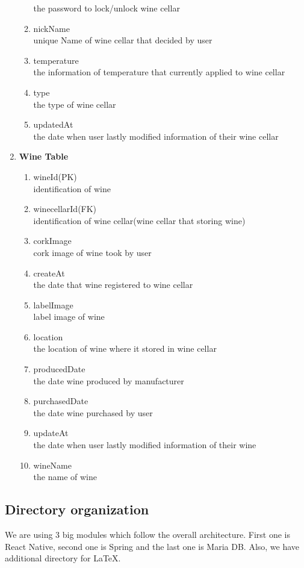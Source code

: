 \documentclass[conference]{IEEEtran}
\numberwithin{figure}{subsection}
\begin{document}
\begin{enumerate}
\begin{enumerate}
        the password to lock/unlock wine cellar
        \item nickName\\
        unique Name of wine cellar that decided by user
        \item temperature\\
        the information of temperature that currently applied to wine cellar
        \item type\\
        the type of wine cellar
        \item updatedAt\\
        the date when user lastly modified information of their wine cellar
    \end{enumerate}
    \item \textbf{Wine Table}
     \begin{enumerate}
        \item wineId(PK)\\
        identification of wine
        \item winecellarId(FK)\\
        identification of wine cellar(wine cellar that storing wine)
        \item corkImage\\
        cork image of wine took by user
        \item createAt\\
        the date that wine registered to wine cellar
        \item labelImage\\
        label image of wine
        \item location\\
        the location of wine where it stored in wine cellar
        \item producedDate\\
        the date wine produced by manufacturer
        \item purchasedDate\\
        the date wine purchased by user
        \item updateAt\\ the date when user lastly modified information of their wine
        \item wineName\\ the name of wine
    \end{enumerate}
\end{enumerate}

\subsection{Directory organization}
We are using 3 big modules which follow the overall architecture. First one is React Native, second one is Spring and the last one is Maria DB. Also, we have additional directory for LaTeX. 
\end{document}
